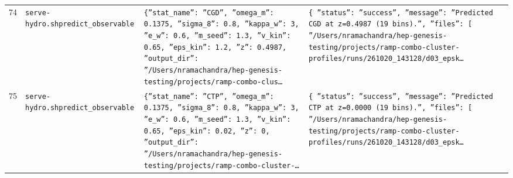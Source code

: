 \documentclass[11pt,a4paper]{article}
\begin{document}
\begin{longtable}{@{}p{}p{}p{}p{}@{}}
74 & \texttt{serve-hydro.sh}\newline\texttt{predict\_\allowbreak{}observable} & \texttt{\{''stat\_\allowbreak{}name'':\allowbreak{} ''CGD'',\allowbreak{} ''omega\_\allowbreak{}m'':\allowbreak{} 0.1375,\allowbreak{} ''sigma\_\allowbreak{}8'':\allowbreak{} 0.8,\allowbreak{} ''kappa\_\allowbreak{}w'':\allowbreak{} 3,\allowbreak{} ''e\_\allowbreak{}w'':\allowbreak{} 0.6,\allowbreak{} ''m\_\allowbreak{}seed'':\allowbreak{} 1.3,\allowbreak{} ''v\_\allowbreak{}kin'':\allowbreak{} 0.65,\allowbreak{} ''eps\_\allowbreak{}kin'':\allowbreak{} 1.2,\allowbreak{} ''z'':\allowbreak{} 0.4987,\allowbreak{} ''output\_\allowbreak{}dir'':\allowbreak{} ''/\allowbreak{}Users/\allowbreak{}nramachandra/\allowbreak{}hep-genesis-testing/\allowbreak{}projects/\allowbreak{}ramp-combo-clus\ldots{}\allowbreak{}} & \texttt{\{   ''status'':\allowbreak{} ''success'',\allowbreak{}   ''message'':\allowbreak{} ''Predicted CGD at z=\allowbreak{}0.4987 (19 bins)\allowbreak{}.'',\allowbreak{}   ''files'':\allowbreak{} [     ''/\allowbreak{}Users/\allowbreak{}nramachandra/\allowbreak{}hep-genesis-testing/\allowbreak{}projects/\allowbreak{}ramp-combo-cluster-profiles/\allowbreak{}runs/\allowbreak{}261020\_\allowbreak{}143128/\allowbreak{}d03\_\allowbreak{}epsk\ldots{}\allowbreak{}} \\
75 & \texttt{serve-hydro.sh}\newline\texttt{predict\_\allowbreak{}observable} & \texttt{\{''stat\_\allowbreak{}name'':\allowbreak{} ''CTP'',\allowbreak{} ''omega\_\allowbreak{}m'':\allowbreak{} 0.1375,\allowbreak{} ''sigma\_\allowbreak{}8'':\allowbreak{} 0.8,\allowbreak{} ''kappa\_\allowbreak{}w'':\allowbreak{} 3,\allowbreak{} ''e\_\allowbreak{}w'':\allowbreak{} 0.6,\allowbreak{} ''m\_\allowbreak{}seed'':\allowbreak{} 1.3,\allowbreak{} ''v\_\allowbreak{}kin'':\allowbreak{} 0.65,\allowbreak{} ''eps\_\allowbreak{}kin'':\allowbreak{} 0.02,\allowbreak{} ''z'':\allowbreak{} 0,\allowbreak{} ''output\_\allowbreak{}dir'':\allowbreak{} ''/\allowbreak{}Users/\allowbreak{}nramachandra/\allowbreak{}hep-genesis-testing/\allowbreak{}projects/\allowbreak{}ramp-combo-cluster-\ldots{}\allowbreak{}} & \texttt{\{   ''status'':\allowbreak{} ''success'',\allowbreak{}   ''message'':\allowbreak{} ''Predicted CTP at z=\allowbreak{}0.0000 (19 bins)\allowbreak{}.'',\allowbreak{}   ''files'':\allowbreak{} [     ''/\allowbreak{}Users/\allowbreak{}nramachandra/\allowbreak{}hep-genesis-testing/\allowbreak{}projects/\allowbreak{}ramp-combo-cluster-profiles/\allowbreak{}runs/\allowbreak{}261020\_\allowbreak{}143128/\allowbreak{}d03\_\allowbreak{}epsk\ldots{}\allowbreak{}} \\

\end{longtable}
\end{document}
